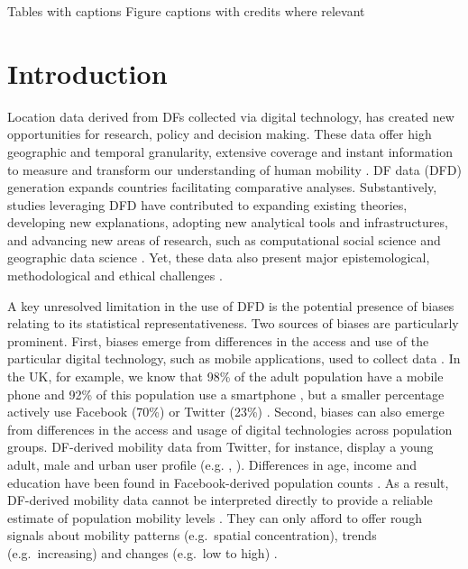 \documentclass[]{rsos}%
\begin{document}
Tables with captions Figure captions with credits where relevant

\newpage

\hypertarget{introduction}{%
\section{Introduction}\label{introduction}}

Location data derived from DFs collected via digital technology, has created new opportunities for research, policy and decision making. These data offer high geographic and temporal granularity, extensive coverage and instant information to measure and transform our understanding of human mobility \citep{oliver20-health}. DF data (DFD) generation expands countries facilitating comparative analyses. Substantively, studies leveraging DFD have contributed to expanding existing theories, developing new explanations, adopting new analytical tools and infrastructures, and advancing new areas of research, such as computational social science and geographic data science \citep{pappalardo23-directions}. Yet, these data also present major epistemological, methodological and ethical challenges \citep{rowe23-bigdata}.

A key unresolved limitation in the use of DFD is the potential presence of biases relating to its statistical representativeness. Two sources of biases are particularly prominent. First, biases emerge from differences in the access and use of the particular digital technology, such as mobile applications, used to collect data \citep{wesolowski13-biases}. In the UK, for example, we know that 98\% of the adult population have a mobile phone and 92\% of this population use a smartphone \citep{ofcom23}, but a smaller percentage actively use Facebook (70\%) or Twitter (23\%) \citep{statista24}. Second, biases can also emerge from differences in the access and usage of digital technologies across population groups. DF-derived mobility data from Twitter, for instance, display a young adult, male and urban user profile (e.g. \citep{mislove21-twitter}, \citep{sloan13-twitter}). Differences in age, income and education have been found in Facebook-derived population counts \citep{ribeiro20-facebook}. As a result, DF-derived mobility data cannot be interpreted directly to provide a reliable estimate of population mobility levels \citep{cesare18-promises}. They can only afford to offer rough signals about mobility patterns (e.g.~spatial concentration), trends (e.g.~increasing) and changes (e.g.~low to high) \citep{rowe22-sensing-ukraine}.
\end{document}
